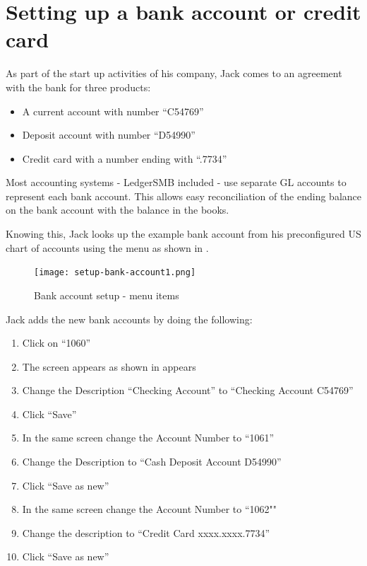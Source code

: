 \section{Setting up a bank account or credit card}
\label{sec-first-login-setup-bank-account}

As part of the start up activities of his company, Jack comes to an agreement with the
bank for three products:

\begin{itemize}
\item A current account with number ``C54769''
\item Deposit account with number ``D54990''
\item Credit card with a number ending with ``.7734''
\end{itemize}

Most accounting systems - LedgerSMB included - use separate GL accounts to represent
each bank account. This allows easy reconciliation of the ending balance on the bank
account with the balance in the books.

Knowing this, Jack looks up the example bank account from his preconfigured US chart of
accounts using the  menu as
shown in .

\begin{figure}[h]
\texttt{[image: setup-bank-account1.png]}
\caption{Bank account setup - menu items}
\label{fig:bank-setup1}
\end{figure}

Jack adds the new bank accounts by doing the following:

\begin{enumerate}
\item Click on ``1060''
\item The screen appears as shown in  appears 
\item Change the Description ``Checking Account'' to ``Checking Account C54769''
\item Click ``Save''
\item In the same screen change the Account Number to ``1061''
\item Change the Description to ``Cash Deposit Account D54990''
\item Click ``Save as new''
\item In the same screen change the Account Number to ``1062""
\item Change the description to ``Credit Card xxxx.xxxx.7734''
\item Click ``Save as new''
\end{enumerate}

